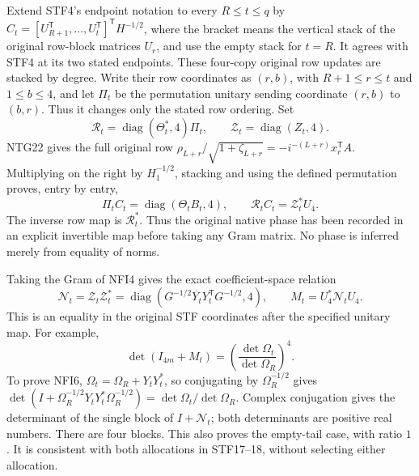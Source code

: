 Extend STF4's endpoint notation to every $R\le t\le q$ by
$C_t=[U_{R+1}^{\mathsf T},\ldots,U_t^{\mathsf T}]^{\mathsf T}H^{-1/2}$,
where the bracket means the vertical stack of the original row-block
matrices $U_r$, and use the empty stack for $t=R$.
It agrees with STF4 at its two stated endpoints.
These four-copy original row updates are stacked by degree. Write their
row coordinates as $(r,b)$, with $R+1\le r\le t$ and $1\le b\le4$,
and let $\Pi_t$ be the permutation unitary sending coordinate
$(r,b)$ to $(b,r)$. Thus it changes only the stated row ordering.
Set
\[
 \mathscr R_t=\operatorname{diag}(\Theta_t^*,4)\Pi_t,\qquad
 \mathscr Z_t=\operatorname{diag}(Z_t,4).
                                                               \tag{NFI3}
\]
NTG22 gives the full original row
$\rho_{L+r}/\sqrt{1+\zeta_{L+r}}=-i^{-(L+r)}x_r^{\mathsf T}A$.
Multiplying on the right by $H_1^{-1/2}$, stacking and using the
defined permutation proves, entry by entry,
\[
 \Pi_t C_t=\operatorname{diag}(\Theta_tB_t,4),\qquad
 \boxed{\mathscr R_t C_t=\mathscr Z_t^*U_4.}
                                                               \tag{NFI4}
\]
The inverse row map is $\mathscr R_t^*$. Thus the original native
phase has been recorded in an explicit invertible map before taking
any Gram matrix. No phase is inferred merely from equality of norms.

Taking the Gram of NFI4 gives the exact coefficient-space relation
\[
 \mathscr N_t=\mathscr Z_t\mathscr Z_t^*
       =\operatorname{diag}(G^{-1/2}\overline{Y_t}Y_t^{\mathsf T}
                                      G^{-1/2},4),\qquad
 M_t=U_4^*\mathscr N_tU_4.
                                                               \tag{NFI5}
\]
This is an equality in the original STF coordinates after the
specified unitary map. For example,
\[
 \det(I_{4m}+M_t)
       =\left(\frac{\det\Omega_t}{\det\Omega_R}\right)^4.
                                                               \tag{NFI6}
\]
To prove NFI6, $\Omega_t=\Omega_R+Y_tY_t^*$, so conjugating
by $\Omega_R^{-1/2}$ gives
$\det(I+\Omega_R^{-1/2}Y_tY_t^*\Omega_R^{-1/2})
=\det\Omega_t/\det\Omega_R$.
Complex conjugation gives the determinant of the single block of
$I+\mathscr N_t$; both determinants are positive real numbers.
There are four blocks. This also proves the empty-tail case, with
ratio $1$. It is consistent with both allocations in STF17--18,
without selecting either allocation.

